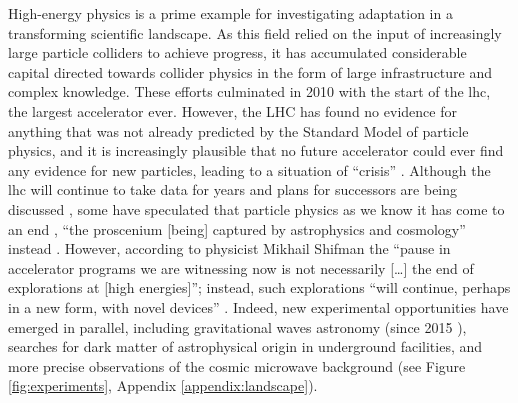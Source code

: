\documentclass{article}
\begin{document}
High-energy physics is a prime example for investigating adaptation in a transforming scientific landscape. As this field relied on the input of increasingly large particle colliders to achieve progress, it has accumulated considerable capital directed towards collider physics in the form of large infrastructure and complex knowledge. These efforts culminated in 2010 with the start of the \gls{lhc}, the largest accelerator ever. However, the LHC has found no evidence for anything that was not already predicted by the Standard Model of particle physics, and it is increasingly plausible that no future accelerator could ever find any evidence for new particles, leading to a situation of ``crisis'' \citep{susy_crisis}. Although the \gls{lhc} will continue to take data for years and plans for successors are being discussed \citep{Roser2023}, some have speculated that particle physics as we know it has come to an end \citep{Harlander2023,Kosyakov2023}%
, ``the proscenium
[being] captured by astrophysics and cosmology'' instead \citep{Kosyakov2023}. However, according to physicist Mikhail Shifman the ``pause in accelerator programs we are witnessing now is not necessarily [\dots] the end of explorations at [high energies]''; instead, such explorations ``will continue, perhaps in a new form, with novel devices'' \citep{Shifman2020}. Indeed, new experimental opportunities have emerged in parallel, including gravitational waves astronomy (since 2015 \citep{Abbott2016}), searches for dark matter of astrophysical origin in underground facilities, and more precise observations of the cosmic microwave background (see Figure \ref{fig:experiments}, Appendix \ref{appendix:landscape}). %
\end{document}
